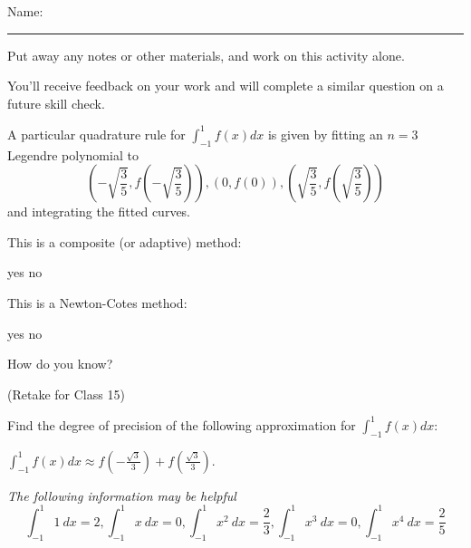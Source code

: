 \documentclass[12pt,letterpaper,noanswers]{exam}
\begin{document}
 \pdfpageheight 11in 
  \pdfpagewidth 8.5in

\noindent Name: \rule{2.5in}{0.5pt}

\noindent Put away any notes or other materials, and work on this activity alone.

\noindent You'll receive feedback on your work and will complete a similar question on a future skill check.


\begin{questions}
\item A particular quadrature rule for $\displaystyle\int_{-1}^1f(x)dx$ is given by fitting an $n=3$ Legendre polynomial to 
$$\left(-\sqrt{\frac{3}{5}},f\left(-\sqrt{\frac{3}{5}}\right)\right), \left(0,f\left(0\right)\right), \left(\sqrt{\frac{3}{5}},f\left(\sqrt{\frac{3}{5}}\right)\right)$$
and integrating the fitted curves.

This is a composite (or adaptive) method:
\begin{oneparchoices}
\choice yes \choice no
\end{oneparchoices}

This is a Newton-Cotes method:
\begin{oneparchoices}
\choice yes \choice no
\end{oneparchoices}

How do you know?


\vspace{4.0cm}

\item (Retake for Class 15)

Find the degree of precision of the following approximation for $\displaystyle\int_{-1}^1 f(x)dx$:

$\displaystyle\int_{-1}^1 f(x)dx\approx f\left(-\frac{\sqrt{3}}{3}\right)+f\left(\frac{\sqrt{3}}{3}\right)$.

\emph{The following information may be helpful}
\[\int_{-1}^1 1\ dx = 2, \int_{-1}^1 x\ dx = 0, \int_{-1}^1 x^2\ dx = \frac{2}{3}, \int_{-1}^1 x^3\ dx =0, \int_{-1}^1 x^4\ dx = \frac{2}{5}\]

\end{questions}
\end{document}
